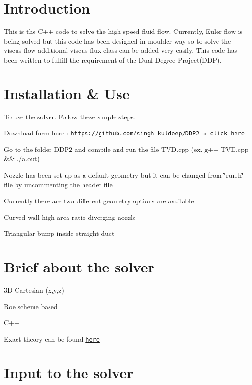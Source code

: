 \hypertarget{index_intro_sec}{}\section{Introduction}\label{index_intro_sec}
This is the C++ code to solve the high speed fluid flow. Currently, Euler flow is being solved but this code has been designed in moulder way so to solve the viscus flow additional viscus flux class can be added very easily. This code has been written to fulfill the requirement of the Dual Degree Project(\+D\+D\+P).\hypertarget{index_install_sec}{}\section{Installation \& Use}\label{index_install_sec}
To use the solver. Follow these simple steps.
\begin{DoxyItemize}
\item Download form here \+: \href{https://github.com/singh-kuldeep/DDP2}{\tt https\+://github.\+com/singh-\/kuldeep/\+D\+D\+P2} or \href{https://github.com/singh-kuldeep/DDP2}{\tt click here}
\item Go to the folder D\+D\+P2 and compile and run the file T\+V\+D.\+cpp (ex. g++ T\+V\+D.\+cpp \&\& ./a.out)
\item Nozzle has been set up as a default geometry but it can be changed from \char`\"{}run.\+h\char`\"{} file by uncommenting the header file
\item Currently there are two different geometry options are available
\begin{DoxyEnumerate}
\item Curved wall high area ratio diverging nozzle
\item Triangular bump inside straight duct
\end{DoxyEnumerate}
\end{DoxyItemize}\hypertarget{index_brief}{}\section{Brief about the solver}\label{index_brief}

\begin{DoxyItemize}
\item 3D Cartesian (x,y,z)
\item Roe scheme based
\item C++
\item Exact theory can be found \href{https://drive.google.com/open?id=0B9x_nh0D_HhzMnBjc0w5MmJpcnc}{\tt here}
\end{DoxyItemize}\hypertarget{index_input}{}\section{Input to the solver}\label{index_input}

